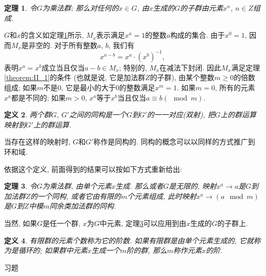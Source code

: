 \documentclass[12pt,a4paper]{book} %
\newtheorem{theorem}{定理}
\newtheorem{definition}[theorem]{定义}
\theoremstyle{remark}
\theoremstyle{example}
\theoremstyle{lemma}
\theoremstyle{corollary}
\numberwithin{theorem}{chapter}
\begin{document}
\begin{theorem} \label{theorem:VII_1}
令$G$为乘法群; 那么对任何的$x \in G$, 由$x$生成的$G$的子群由元素$x^n$, $n \in Z$组成.
\end{theorem}

$G$和$x$的含义如定理\ref{theorem:VII_1}所示, $M_x$表示满足$x^a = 1$的整数$a$构成的集合. 由于$x^0 = 1$, 因而$M_x$是非空的. 对于所有整数$a$, $b$, 我们有
\[
x^{a - b} = x^a \cdot (x^b)^{-1},
\]
表明$x^a = x^b$成立当且仅当$a - b \in M_x$; 特别的, $M_x$在减法下封闭. 因此$M_x$满足定理\ref{theorem:II_1}的条件 (也就是说, 它是加法群$Z$的子群), 由某个整数$m \ge 0$的倍数组成; 如果$m$不是0, 它是最小的大于0的整数满足$x^m = 1$. 如果$m = 0$, 所有的元素$x^a$都是不同的; 如果$m > 0$, $x^a$等于$x^b$当且仅当$a \equiv b (\mod m)$.

\begin{definition} \label{def:VII_2}
两个群$G$, $G'$之间的同构是一个$G$到$G'$的一一对应(双射), 把$G$上的群运算映射到$G'$上的群运算.
\end{definition}

当存在这样的映射时, $G$和$G'$称作是同构的. 同构的概念可以以同样的方式推广到环和域.

依据这个定义, 前面得到的结果可以按如下方式重新给出:

\begin{theorem} \label{theorem:VII_2}
令$G$为乘法群, 由单个元素$x$生成. 那么或者$G$是无限的, 映射$x^a \rightarrow a$是$G$到加法群$Z$的一个同构, 或者它由有限的$m$个元素组成, 此时映射$x^a \rightarrow (a \mod m)$ 是$G$到$Z$中模$m$同余类加法群的同构.
\end{theorem}

当然, 如果$G$是任一个群, $x$为$G$中元素, 定理\ref{theorem:VII_2}可以应用到由$x$生成的$G$的子群上.

\begin{definition} \label{def:VII_3}
有限群的元素个数称为它的阶数. 如果有限群是由单个元素生成的, 它就称为是循环的; 如果群中元素$x$生成一个$m$阶的群, 那么$m$称作元素$x$的阶.
\end{definition}

习题
\end{document}
